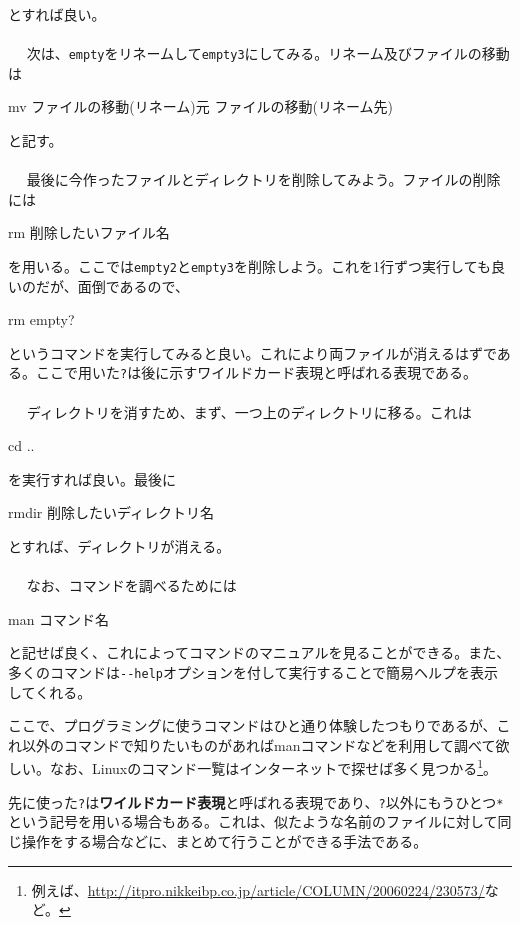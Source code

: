 とすれば良い。
\\ \\　
次は、\verb|empty|をリネームして\verb|empty3|にしてみる。リネーム及びファイルの移動は
\begin{code}
mv ファイルの移動(リネーム)元 ファイルの移動(リネーム先)
\end{code}
と記す。
\\ \\　
最後に今作ったファイルとディレクトリを削除してみよう。ファイルの削除には
\begin{code}
rm 削除したいファイル名
\end{code}
を用いる。ここでは\verb|empty2|と\verb|empty3|を削除しよう。これを1行ずつ実行しても良いのだが、面倒であるので、
\begin{code}
rm empty?
\end{code}
というコマンドを実行してみると良い。これにより両ファイルが消えるはずである。ここで用いた\verb|?|は後に示すワイルドカード表現と呼ばれる表現である。
\\ \\　
ディレクトリを消すため、まず、一つ上のディレクトリに移る。これは
\begin{code}
cd ..
\end{code}
を実行すれば良い。最後に
\begin{code}
rmdir 削除したいディレクトリ名
\end{code}
とすれば、ディレクトリが消える。
\\ \\　
なお、コマンドを調べるためには
\begin{code}
man コマンド名
\end{code}
と記せば良く、これによってコマンドのマニュアルを見ることができる。また、多くのコマンドは\verb|--help|オプションを付して実行することで簡易ヘルプを表示してくれる。

ここで、プログラミングに使うコマンドはひと通り体験したつもりであるが、これ以外のコマンドで知りたいものがあればmanコマンドなどを利用して調べて欲しい。なお、Linuxのコマンド一覧はインターネットで探せば多く見つかる\footnote{例えば、\url{http://itpro.nikkeibp.co.jp/article/COLUMN/20060224/230573/}など。}。

先に使った\verb|?|は\textbf{ワイルドカード表現}と呼ばれる表現であり、\verb|?|以外にもうひとつ\verb|*|という記号を用いる場合もある。これは、似たような名前のファイルに対して同じ操作をする場合などに、まとめて行うことができる手法である。

